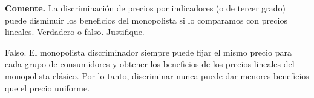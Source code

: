 \question \textbf{Comente.} La discriminación de precios por indicadores (o de tercer grado) puede disminuir los beneficios del monopolista si lo comparamos con precios lineales. Verdadero o falso. Justifique.
\begin{solution}
Falso. El monopolista discriminador siempre puede fijar el mismo precio para cada grupo de consumidores y obtener los beneficios de los precios lineales del monopolista clásico. Por lo tanto, discriminar nunca puede dar menores beneficios que el precio uniforme.

\end{solution}

